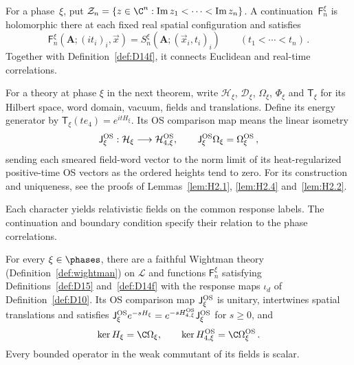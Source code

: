 \begin{definition}\label{def:D15}
For a phase~$\xi$, put $\mathcal Z_n=\{z\in\C^n:\operatorname{Im}z_1<\cdots<\operatorname{Im}z_n\}$. A continuation~$\mathsf F_n^\xi$ is holomorphic there at each fixed real spatial configuration and satisfies
\begin{equation*}
\mathsf F_n^\xi(\boldsymbol A;(it_i)_i,\vec x)=S_n^\xi(\boldsymbol A;(\vec x_i,t_i)_i)\qquad(t_1<\cdots<t_n)\,.
\end{equation*}
Together with Definition~\ref{def:D14f}, it connects Euclidean and real-time correlations.
\end{definition}

For a theory at phase $\xi$ in the next theorem, write $\mathcal H_\xi$, $\mathcal D_\xi$, $\Omega_\xi$, $\Phi_\xi$ and $\mathsf T_\xi$ for its Hilbert space, word domain, vacuum, fields and translations. Define its energy generator by $\mathsf T_\xi(te_4)=e^{itH_\xi}$. Its OS comparison map means the linear isometry
\begin{equation*}
\mathsf J_\xi^{\rm OS}:\mathcal H_\xi\longrightarrow\mathcal H_{4,\xi}^{\rm OS},\qquad
\mathsf J_\xi^{\rm OS}\Omega_\xi=\Omega_\xi^{\rm OS}\,,
\end{equation*}
sending each smeared field-word vector to the norm limit of its heat-regularized positive-time OS vectors as the ordered heights tend to zero. For its construction and uniqueness, see the proofs of Lemmas~\ref{lem:H2.1}, \ref{lem:H2.4} and~\ref{lem:H2.2}.

Each character yields relativistic fields on the common response labels. The continuation and boundary condition specify their relation to the phase correlations.

\begin{theorem}[RC. Reconstruction]\label{prop:RC}
For every $\xi\in\phases$, there are a faithful Wightman theory (Definition~\ref{def:wightman}) on $\mathcal L$ and functions $\mathsf F_n^\xi$ satisfying Definitions~\ref{def:D15} and~\ref{def:D14f} with the response maps $\iota_d$ of Definition~\ref{def:D10}. Its OS comparison map $\mathsf J_\xi^{\rm OS}$ is unitary, intertwines spatial translations and satisfies $\mathsf J_\xi^{\rm OS}e^{-sH_\xi}=e^{-sH_{4,\xi}^{\rm OS}}\mathsf J_\xi^{\rm OS}$ for $s\ge0$, and
\begin{equation*}
\ker H_\xi=\C\Omega_\xi,\qquad \ker H_{4,\xi}^{\rm OS}=\C\Omega_\xi^{\rm OS}\,.
\end{equation*}
Every bounded operator in the weak commutant of its fields is scalar.
\end{theorem}

